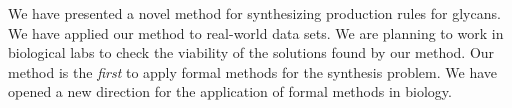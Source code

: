 % 
We have presented a novel method for synthesizing production rules for glycans.
We have applied our method to real-world data sets. %
We are planning to work in biological labs to check the viability of the solutions
found by our method.
Our method is the {\em first} to apply formal methods for the synthesis problem.
We have opened a new direction for the application of formal methods in biology.





